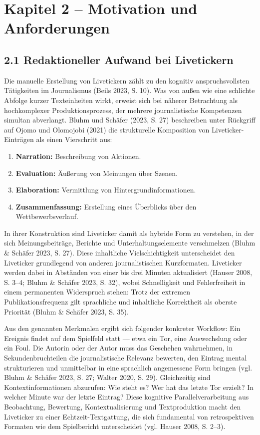 \section{Kapitel 2 -- Motivation und
Anforderungen}\label{kapitel-2-motivation-und-anforderungen}

\subsection{2.1 Redaktioneller Aufwand bei
Livetickern}\label{redaktioneller-aufwand-bei-livetickern}

Die manuelle Erstellung von Livetickern zählt zu den kognitiv
anspruchsvollsten Tätigkeiten im Journalismus (Beils 2023, S. 10). Was
von außen wie eine schlichte Abfolge kurzer Texteinheiten wirkt, erweist
sich bei näherer Betrachtung als hochkomplexer Produktionsprozess, der
mehrere journalistische Kompetenzen simultan abverlangt. Bluhm und
Schäfer (2023, S. 27) beschreiben unter Rückgriff auf Ojomo und
Olomojobi (2021) die strukturelle Komposition von Liveticker-Einträgen
als einen Vierschritt aus:

\begin{enumerate}
\def\labelenumi{\arabic{enumi}.}
\tightlist
\item
  \textbf{Narration:} Beschreibung von Aktionen.
\item
  \textbf{Evaluation:} Äußerung von Meinungen über Szenen.
\item
  \textbf{Elaboration:} Vermittlung von Hintergrundinformationen.
\item
  \textbf{Zusammenfassung:} Erstellung eines Überblicks über den
  Wettbewerbsverlauf.
\end{enumerate}

In ihrer Konstruktion sind Liveticker damit als hybride Form zu
verstehen, in der sich Meinungsbeiträge, Berichte und
Unterhaltungselemente verschmelzen (Bluhm \& Schäfer 2023, S. 27). Diese
inhaltliche Vielschichtigkeit unterscheidet den Liveticker grundlegend
von anderen journalistischen Kurzformaten. Liveticker werden dabei in
Abständen von einer bis drei Minuten aktualisiert (Hauser 2008, S. 3--4;
Bluhm \& Schäfer 2023, S. 32), wobei Schnelligkeit und Fehlerfreiheit in
einem permanenten Widerspruch stehen: Trotz der extremen
Publikationsfrequenz gilt sprachliche und inhaltliche Korrektheit als
oberste Priorität (Bluhm \& Schäfer 2023, S. 35).

Aus den genannten Merkmalen ergibt sich folgender konkreter Workflow:
Ein Ereignis findet auf dem Spielfeld statt --- etwa ein Tor, eine
Auswechslung oder ein Foul. Die Autorin oder der Autor muss das
Geschehen wahrnehmen, in Sekundenbruchteilen die journalistische
Relevanz bewerten, den Eintrag mental strukturieren und unmittelbar in
eine sprachlich angemessene Form bringen (vgl. Bluhm \& Schäfer 2023, S.
27; Walter 2020, S. 29). Gleichzeitig sind Kontextinformationen
abzurufen: Wie steht es? Wer hat das letzte Tor erzielt? In welcher
Minute war der letzte Eintrag? Diese kognitive Parallelverarbeitung aus
Beobachtung, Bewertung, Kontextualisierung und Textproduktion macht den
Liveticker zu einer Echtzeit-Textgattung, die sich fundamental von
retrospektiven Formaten wie dem Spielbericht unterscheidet (vgl. Hauser
2008, S. 2--3).

